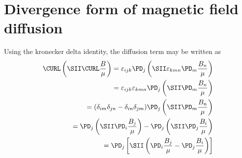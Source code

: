 \documentclass[11pt]{article}
\begin{document}
\doublespacing
\MOONSTITLE
\maketitle

\section{Divergence form of magnetic field diffusion}

Using the kronecker delta identity, the diffusion term may be written as
\begin{equation}\begin{aligned}
	\CURL \left( \SII \CURL \frac{B}{\mu} \right)
	 = \varepsilon_{ijk} \PD_j \left( \SII \varepsilon_{kmn} \PD_m \frac{B_n}{\mu} \right) \\
	 = \varepsilon_{ijk} \varepsilon_{kmn} \PD_j \left( \SII \PD_m \frac{B_n}{\mu} \right) \\
	 = (\delta_{im}\delta_{jn} - \delta_{in}\delta_{jm}) \PD_j \left( \SII \PD_m \frac{B_n}{\mu} \right) \\
	  = \PD_j \left( \SII \PD_i \frac{B_j}{\mu} \right) - \PD_j \left( \SII \PD_j \frac{B_i}{\mu} \right) \\
	  = \PD_j \left[ \SII \left( \PD_i \frac{B_j}{\mu} - \PD_j \frac{B_i}{\mu} \right) \right]
\end{aligned}\end{equation}
\end{document}
